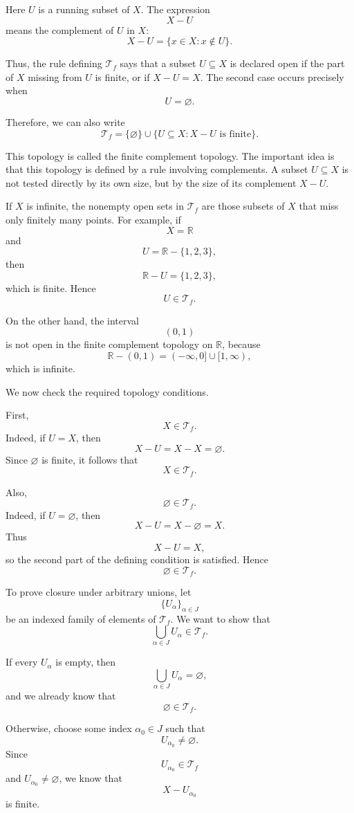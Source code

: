 \documentclass{article}
\begin{document}
	Here \(U\) is a running subset of \(X\). The expression
	\[
	X-U
	\]
	means the complement of \(U\) in \(X\):
	\[
	X-U=\{x\in X:x\notin U\}.
	\]
	
	Thus, the rule defining \(\mathcal T_f\) says that a subset \(U\subseteq X\) is declared open if the part of \(X\) missing from \(U\) is finite, or if \(X-U=X\). The second case occurs precisely when
	\[
	U=\varnothing.
	\]
	
	Therefore, we can also write
	\[
	\mathcal T_f
	=
	\{\varnothing\}
	\cup
	\{U\subseteq X:X-U\text{ is finite}\}.
	\]
	
	This topology is called the finite complement topology. The important idea is that this topology is defined by a rule involving complements. A subset \(U\subseteq X\) is not tested directly by its own size, but by the size of its complement \(X-U\).
	
	If \(X\) is infinite, the nonempty open sets in \(\mathcal T_f\) are those subsets of \(X\) that miss only finitely many points. For example, if
	\[
	X=\mathbb R
	\]
	and
	\[
	U=\mathbb R-\{1,2,3\},
	\]
	then
	\[
	\mathbb R-U=\{1,2,3\},
	\]
	which is finite. Hence
	\[
	U\in\mathcal T_f.
	\]
	
	On the other hand, the interval
	\[
	(0,1)
	\]
	is not open in the finite complement topology on \(\mathbb R\), because
	\[
	\mathbb R-(0,1)=(-\infty,0]\cup[1,\infty),
	\]
	which is infinite.
	
	We now check the required topology conditions.
	
	First,
	\[
	X\in\mathcal T_f.
	\]
	Indeed, if \(U=X\), then
	\[
	X-U=X-X=\varnothing.
	\]
	Since \(\varnothing\) is finite, it follows that
	\[
	X\in\mathcal T_f.
	\]
	
	Also,
	\[
	\varnothing\in\mathcal T_f.
	\]
	Indeed, if \(U=\varnothing\), then
	\[
	X-U=X-\varnothing=X.
	\]
	Thus
	\[
	X-U=X,
	\]
	so the second part of the defining condition is satisfied. Hence
	\[
	\varnothing\in\mathcal T_f.
	\]
	
	To prove closure under arbitrary unions, let
	\[
	\{U_\alpha\}_{\alpha\in J}
	\]
	be an indexed family of elements of \(\mathcal T_f\). We want to show that
	\[
	\bigcup_{\alpha\in J}U_\alpha\in\mathcal T_f.
	\]
	
	If every \(U_\alpha\) is empty, then
	\[
	\bigcup_{\alpha\in J}U_\alpha=\varnothing,
	\]
	and we already know that
	\[
	\varnothing\in\mathcal T_f.
	\]
	
	Otherwise, choose some index \(\alpha_0\in J\) such that
	\[
	U_{\alpha_0}\neq\varnothing.
	\]
	Since
	\[
	U_{\alpha_0}\in\mathcal T_f
	\]
	and \(U_{\alpha_0}\neq\varnothing\), we know that
	\[
	X-U_{\alpha_0}
	\]
	is finite.
	
\end{document}
